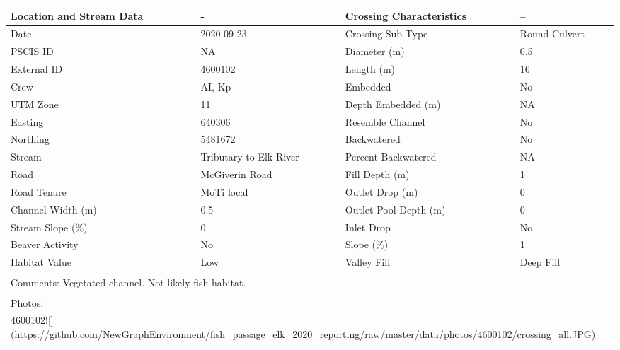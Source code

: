 \documentclass[
]{book}
\begin{document}
\begin{tabular}{l|l|l|l}
\hline
Location and Stream Data & - & Crossing Characteristics & --\\
\hline
Date & 2020-09-23 & Crossing Sub Type & Round Culvert\\
\hline
PSCIS ID & NA & Diameter (m) & 0.5\\
\hline
External ID & 4600102 & Length (m) & 16\\
\hline
Crew & AI, Kp & Embedded & No\\
\hline
UTM Zone & 11 & Depth Embedded (m) & NA\\
\hline
Easting & 640306 & Resemble Channel & No\\
\hline
Northing & 5481672 & Backwatered & No\\
\hline
Stream & Tributary to Elk River & Percent Backwatered & NA\\
\hline
Road & McGiverin Road & Fill Depth (m) & 1\\
\hline
Road Tenure & MoTi local & Outlet Drop (m) & 0\\
\hline
Channel Width (m) & 0.5 & Outlet Pool Depth (m) & 0\\
\hline
Stream Slope (\%) & 0 & Inlet Drop & No\\
\hline
Beaver Activity & No & Slope (\%) & 1\\
\hline
Habitat Value & Low & Valley Fill & Deep Fill\\
\hline
\multicolumn{4}{l}{\textsuperscript{} Comments: Vegetated channel. Not likely fish habitat.}\\
\multicolumn{4}{l}{\textsuperscript{} Photos:}\\
\multicolumn{4}{l}{4600102![](https://github.com/NewGraphEnvironment/fish\_passage\_elk\_2020\_reporting/raw/master/data/photos/4600102/crossing\_all.JPG)}\\
\end{tabular}
\end{document}
